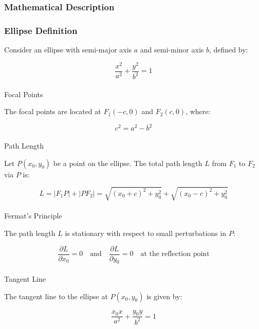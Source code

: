 \documentclass[
  a4paper,
]{book}
\makeatletter
\let\oldparagraph\paragraph
\renewcommand{\paragraph}{
    \@ifstar
      \xxxParagraphStar
      \xxxParagraphNoStar
  }
\newcommand{\xxxParagraphStar}[1]{\oldparagraph*{#1}\mbox{}}
\newcommand{\xxxParagraphNoStar}[1]{\oldparagraph{#1}\mbox{}}
\makeatother
\begin{document}
\begin{tcolorbox}
\subsubsection{Mathematical Description}\label{mathematical-description}

\subsubsection{Ellipse Definition}\label{ellipse-definition}

Consider an ellipse with semi-major axis \(a\) and semi-minor axis
\(b\), defined by:

\[\frac{x^2}{a^2} + \frac{y^2}{b^2} = 1\]

\paragraph{Focal Points}\label{focal-points}

The focal points are located at \(F_1(-c, 0)\) and \(F_2(c, 0)\), where:

\[c^2 = a^2 - b^2\]

\paragraph{Path Length}\label{path-length}

Let \(P(x_0, y_0)\) be a point on the ellipse. The total path length
\(L\) from \(F_1\) to \(F_2\) via \(P\) is:

\[L = |F_1P| + |PF_2| = \sqrt{(x_0+c)^2 + y_0^2} + \sqrt{(x_0-c)^2 + y_0^2}\]

\paragraph{Fermat's Principle}\label{fermats-principle-1}

The path length \(L\) is stationary with respect to small perturbations
in \(P\):

\[\frac{\partial L}{\partial x_0} = 0 \quad \text{and} \quad \frac{\partial L}{\partial y_0} = 0 \quad \text{at the reflection point}\]

\paragraph{Tangent Line}\label{tangent-line}

The tangent line to the ellipse at \(P(x_0, y_0)\) is given by:

\[\frac{x_0x}{a^2} + \frac{y_0y}{b^2} = 1\]


\end{tcolorbox}
\end{document}
